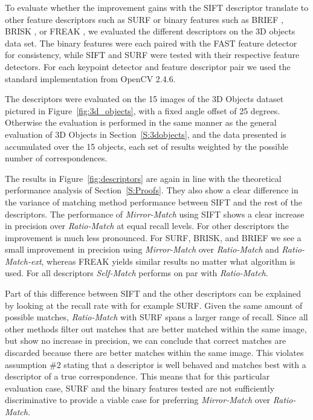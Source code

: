 \documentclass[review]{elsarticle}
\begin{document}
To evaluate whether the improvement gains with the SIFT descriptor translate to other feature descriptors such as SURF \cite{bay2006surf} or binary features such as BRIEF \cite{calonder2010brief}, BRISK \cite{leutenegger2011brisk}, or FREAK \cite{alahi2012freak}, we evaluated the different descriptors on the 3D objects data set.  The binary features were each paired with the FAST feature detector for consistency, while SIFT and SURF were tested with their respective feature detectors.  For each keypoint detector and feature descriptor pair we used the standard implementation from OpenCV 2.4.6.

The descriptors were evaluated on the 15 images  of the 3D Objects dataset pictured in Figure~\ref{fig:3d_objects}, with a fixed angle offset of 25 degrees.  Otherwise the evaluation is performed in the same manner as the general evaluation of 3D Objects in Section~\ref{S:3dobjects}, and the data presented is accumulated over the 15 objects, each set of results weighted by the possible number of correspondences.

The results in Figure~\ref{fig:descriptors} are again in line with the theoretical performance analysis of Section~\ref{S:Proofs}. They also show a clear difference in the variance of matching method performance between SIFT and the rest of the descriptors. The performance of \emph{Mirror-Match} using SIFT shows a clear increase in precision over \emph{Ratio-Match} at equal recall levels. For other descriptors the improvement is much less pronounced.  For SURF, BRISK, and BRIEF we see a small improvement in precision using \emph{Mirror-Match} over \emph{Ratio-Match} and \emph{Ratio-Match-ext}, whereas FREAK yields similar results no matter what algorithm is used.  For all descriptors \emph{Self-Match} performs on par with \emph{Ratio-Match}.

Part of this difference between SIFT and the other descriptors can be explained by looking at the recall rate with for example SURF\@. Given the same amount of possible matches, \emph{Ratio-Match} with SURF spans a larger range of recall.  Since all other methods filter out matches that are better matched within the same image, but show no increase in precision, we can conclude that correct matches are discarded because there are better matches within the same image. This violates assumption \#2 stating that a descriptor is well behaved and matches best with a descriptor of a true correspondence. This means that for this particular evaluation case, SURF and the binary features tested are not sufficiently discriminative to provide a viable case for preferring \emph{Mirror-Match} over \emph{Ratio-Match}.
\end{document}
